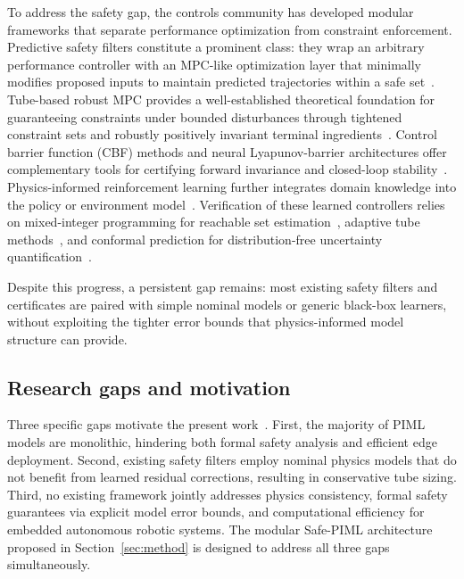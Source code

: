 \documentclass[12pt,a4paper]{article}
\begin{document}
To address the safety gap, the controls community has developed modular
frameworks that separate performance optimization from constraint
enforcement. Predictive safety filters constitute a prominent class:
they wrap an arbitrary performance controller with an MPC-like
optimization layer that minimally modifies proposed inputs to maintain
predicted trajectories within a safe
set~\cite{wabersich2021psf,wabersich2023tutorial}. Tube-based robust
MPC provides a well-established theoretical foundation for guaranteeing
constraints under bounded disturbances through tightened constraint
sets and robustly positively invariant terminal
ingredients~\cite{mayne2005robust,gao2024rigid}. Control barrier
function (CBF) methods and neural Lyapunov-barrier architectures offer
complementary tools for certifying forward invariance and closed-loop
stability~\cite{ames2017cbf,dawson2023survey,chen2023backupCBF,xiao2023dpcbf}.
Physics-informed reinforcement learning further integrates domain
knowledge into the policy or environment
model~\cite{ordonez2023pirl,gros2022learning}. Verification of these
learned controllers relies on mixed-integer programming for reachable
set estimation~\cite{liu2021algorithms,schwan2023evanqp,lopez2023nnv},
adaptive tube
methods~\cite{gao2024rigid,koller2022learning}, and conformal
prediction for distribution-free uncertainty
quantification~\cite{lindemann2023conformal}.

Despite this progress, a persistent gap remains: most existing safety
filters and certificates are paired with simple nominal models or
generic black-box learners, without exploiting the tighter error bounds
that physics-informed model structure can provide.

\subsection{Research gaps and motivation}
\label{subsec:bg-gaps}

Three specific gaps motivate the present
work~\cite{nghiem2023piml,bernal2025safePIML}. First, the majority of
PIML models are monolithic, hindering both formal safety analysis and
efficient edge deployment. Second, existing safety filters employ
nominal physics models that do not benefit from learned residual
corrections, resulting in conservative tube sizing. Third, no existing
framework jointly addresses physics consistency, formal safety
guarantees via explicit model error bounds, and computational efficiency
for embedded autonomous robotic systems. The modular Safe-PIML
architecture proposed in Section~\ref{sec:method} is designed to
address all three gaps simultaneously.
\end{document}

